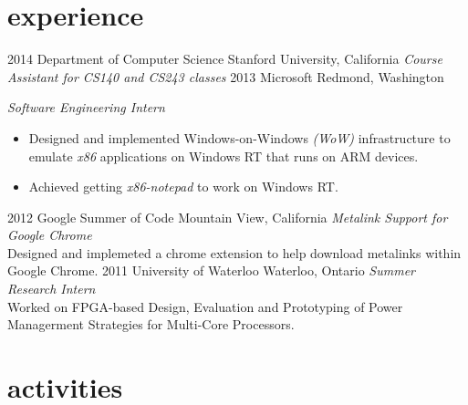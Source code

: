 \documentclass[]{friggeri-cv} %
\begin{document}

\section{experience}

\begin{entrylist}
\entry
{2014}
{Department of Computer Science}
{Stanford University, California}
{\emph{Course Assistant for CS140 and CS243 classes}
}
\entry
{2013}
{Microsoft}
{Redmond, Washington}
{\emph{Software Engineering Intern}
\begin{itemize}
\item Designed and implemented Windows-on-Windows \emph{(WoW)} infrastructure to emulate \emph{x86} applications on Windows RT that runs on ARM devices.
\item Achieved getting \emph{x86-notepad} to work on Windows RT.
\end{itemize}
}
\entry
{2012}
{Google Summer of Code}
{Mountain View, California}
{\emph{Metalink Support for Google Chrome} \\
Designed and implemeted a chrome extension to help download metalinks within Google Chrome.}
\entry
{2011}
{University of Waterloo}
{Waterloo, Ontario}
{\emph{Summer Research Intern} \\
Worked on FPGA-based Design, Evaluation and Prototyping of Power Managerment Strategies for Multi-Core Processors.}
\end{entrylist}


\section{activities}
\end{document}
